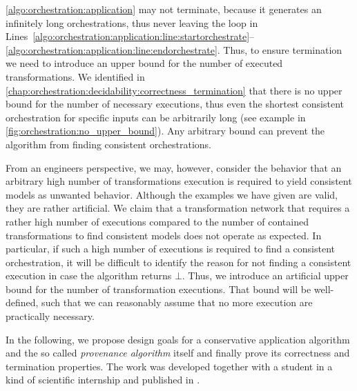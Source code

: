 \autoref{algo:orchestration:application} may not terminate, because it generates an infinitely long orchestrations, thus never leaving the loop in Lines~\ref{algo:orchestration:application:line:startorchestrate}--\ref{algo:orchestration:application:line:endorchestrate}.
Thus, to ensure termination we need to introduce an upper bound for the number of executed transformations.
We identified in \autoref{chap:orchestration:decidability:correctness_termination} that there is no upper bound for the number of necessary executions, thus even the shortest consistent orchestration for specific inputs can be arbitrarily long (see example in \autoref{fig:orchestration:no_upper_bound}).
Any arbitrary bound can prevent the algorithm from finding consistent orchestrations.

From an engineers perspective, we may, however, consider the behavior that an arbitrary high number of transformations execution is required to yield consistent models as unwanted behavior.
Although the examples we have given are valid, they are rather artificial.
We claim that a transformation network that requires a rather high number of executions compared to the number of contained transformations to find consistent models does not operate as expected.
In particular, if such a high number of executions is required to find a consistent orchestration, it will be difficult to identify the reason for not finding a consistent execution in case the algorithm returns $\bot$.
Thus, we introduce an artificial upper bound for the number of transformation executions.
That bound will be well-defined, such that we can reasonably assume that no more execution are practically necessary.

In the following, we propose design goals for a conservative application algorithm and the so called \emph{provenance algorithm} itself and finally prove its correctness and termination properties.
The work was developed together with a student in a kind of scientific internship and published in \cite{gleitze2020orchestration}.


